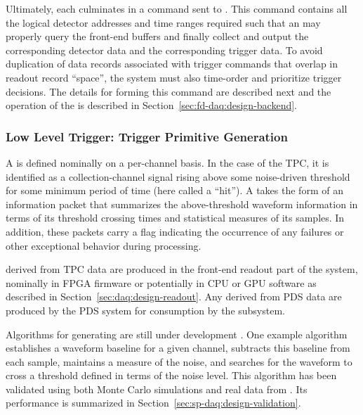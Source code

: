 Ultimately, each  culminates in a command sent to . 
This command contains all the logical detector addresses and time ranges
required such that an  may properly query the front-end
buffers and finally collect and output the corresponding detector data
and the corresponding trigger data. To avoid duplication of data
records associated with trigger commands that overlap in readout
record ``space'', the  system must also time-order and
prioritize trigger decisions. The details for forming this
command are described next and the operation of the  is
described in Section~\ref{sec:fd-daq:design-backend}.

\subsubsection{Low Level Trigger: Trigger Primitive Generation}
\label{sec:sp-daq:design-trigger-primitives}

A  is defined nominally on a per-channel basis. In the case of
the \single TPC, it is identified as a collection-channel signal rising above some
noise-driven threshold for some minimum period of time (here called a
``hit'').
A  takes the form of an information packet that 
summarizes the above-threshold waveform information in terms of its
threshold crossing times and statistical measures of its  samples. 
In addition, these packets carry a flag indicating the occurrence of any
failures or other exceptional behavior during  processing.

 derived from TPC data
are produced in the front-end readout part of the  system,
nominally in FPGA firmware or potentially in CPU or GPU software as described in
Section~\ref{sec:daq:design-readout}.
Any  derived from PDS data are produced by the PDS system
for consumption by the   subsystem.

Algorithms for generating  are still under development
\cite{docid-11275}. 
One example algorithm\cite{docid-11236} establishes a waveform baseline
for a given channel, subtracts this baseline from each sample, maintains
a measure of the noise, and searches for the waveform to cross a
threshold defined in terms of the noise level.
This algorithm has been validated using both Monte Carlo simulations and
real data from . 
Its performance is summarized in
Section~\ref{sec:sp-daq:design-validation}.

